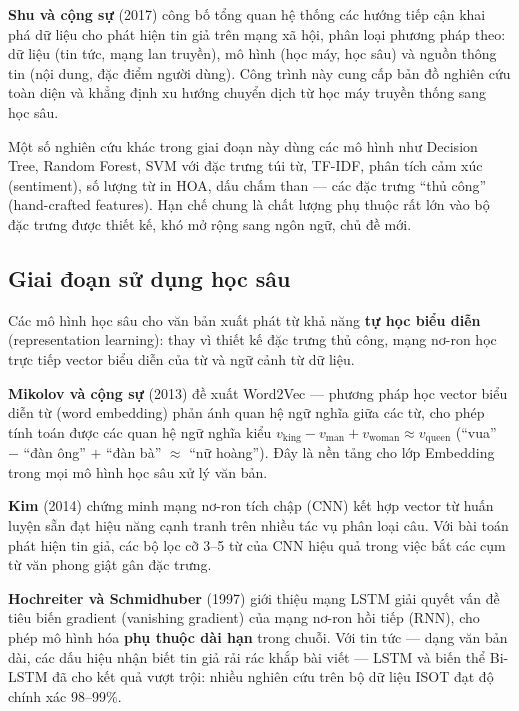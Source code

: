 \textbf{Shu và cộng sự} (2017) \cite{shu2017} công bố tổng quan hệ thống các hướng tiếp cận khai phá dữ liệu cho phát hiện tin giả trên mạng xã hội, phân loại phương pháp theo: dữ liệu (tin tức, mạng lan truyền), mô hình (học máy, học sâu) và nguồn thông tin (nội dung, đặc điểm người dùng). Công trình này cung cấp bản đồ nghiên cứu toàn diện và khẳng định xu hướng chuyển dịch từ học máy truyền thống sang học sâu.

Một số nghiên cứu khác trong giai đoạn này dùng các mô hình như Decision Tree, Random Forest, SVM với đặc trưng túi từ, TF-IDF, phân tích cảm xúc (sentiment), số lượng từ in HOA, dấu chấm than --- các đặc trưng ``thủ công'' (hand-crafted features). Hạn chế chung là chất lượng phụ thuộc rất lớn vào bộ đặc trưng được thiết kế, khó mở rộng sang ngôn ngữ, chủ đề mới.

\subsection{Giai đoạn sử dụng học sâu}

Các mô hình học sâu cho văn bản xuất phát từ khả năng \textbf{tự học biểu diễn} (representation learning): thay vì thiết kế đặc trưng thủ công, mạng nơ-ron học trực tiếp vector biểu diễn của từ và ngữ cảnh từ dữ liệu.

\textbf{Mikolov và cộng sự} (2013) \cite{word2vec} đề xuất Word2Vec --- phương pháp học vector biểu diễn từ (word embedding) phản ánh quan hệ ngữ nghĩa giữa các từ, cho phép tính toán được các quan hệ ngữ nghĩa kiểu $v_{\text{king}} - v_{\text{man}} + v_{\text{woman}} \approx v_{\text{queen}}$ (``vua'' $-$ ``đàn ông'' $+$ ``đàn bà'' $\approx$ ``nữ hoàng''). Đây là nền tảng cho lớp Embedding trong mọi mô hình học sâu xử lý văn bản.

\textbf{Kim} (2014) \cite{kim2014} chứng minh mạng nơ-ron tích chập (CNN) kết hợp vector từ huấn luyện sẵn đạt hiệu năng cạnh tranh trên nhiều tác vụ phân loại câu. Với bài toán phát hiện tin giả, các bộ lọc cỡ 3--5 từ của CNN hiệu quả trong việc bắt các cụm từ văn phong giật gân đặc trưng.

\textbf{Hochreiter và Schmidhuber} (1997) \cite{lstm} giới thiệu mạng LSTM giải quyết vấn đề tiêu biến gradient (vanishing gradient) của mạng nơ-ron hồi tiếp (RNN), cho phép mô hình hóa \textbf{phụ thuộc dài hạn} trong chuỗi. Với tin tức --- dạng văn bản dài, các dấu hiệu nhận biết tin giả rải rác khắp bài viết --- LSTM và biến thể Bi-LSTM đã cho kết quả vượt trội: nhiều nghiên cứu trên bộ dữ liệu ISOT đạt độ chính xác 98--99\%.

